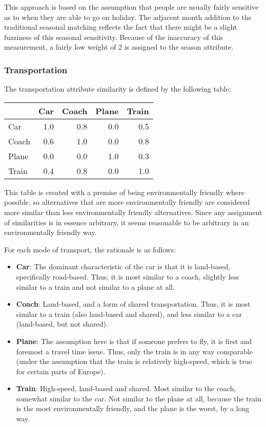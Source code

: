 \documentclass[a4paper,11pt]{scrartcl}
\begin{document}
This approach is based on the assumption that people are usually
fairly sensitive as to when they are able to go on holiday. The
adjacent month addition to the traditional seasonal matching reflects
the fact that there might be a slight fuzziness of this seasonal
sensitivity. Because of the inaccuracy of this measurement, a fairly
low weight of 2 is assigned to the season attribute.

\subsubsection{Transportation}
The transportation attribute similarity is defined by the following
table:


\begin{center}
\begin{tabular}{l|rrrr}
        &  Car  &  Coach  &  Plane  &  Train  \\
\hline
 Car    &  1.0  &    0.8  &    0.0  &    0.5  \\
 Coach  &  0.6  &    1.0  &    0.0  &    0.8  \\
 Plane  &  0.0  &    0.0  &    1.0  &    0.3  \\
 Train  &  0.4  &    0.8  &    0.0  &    1.0  \\
\end{tabular}
\end{center}

This table is created with a premise of being environmentally friendly
where possible, so alternatives that are more environmentally
friendly are considered more similar than less environmentally
friendly alternatives. Since any assignment of similarities is in
essence arbitrary, it seems reasonable to be arbitrary in an
environmentally friendly way.

For each mode of transport, the rationale is as follows:

\begin{itemize}
\item \textbf{Car}: The dominant characteristic of the car is that it is
  land-based, specifically road-based. Thus, it is most similar to a
  coach, slightly less similar to a train and not similar to a plane
  at all.
\item \textbf{Coach}: Land-based, and a form of shared transportation.
  Thus, it is most similar to a train (also land-based and shared),
  and less similar to a car (land-based, but not shared).
\item \textbf{Plane}: The assumption here is that if someone prefers
  to fly, it is first and foremost a travel time issue. Thus, only the
  train is in any way comparable (under the assumption that the train
  is relatively high-speed, which is true for certain parts of
  Europe).
\item \textbf{Train}: High-speed, land-based and shared. Most similar
  to the coach, somewhat similar to the car. Not similar to the plane
  at all, because the train is the most environmentally friendly, and
  the plane is the worst, by a long way.
\end{itemize}
\end{document}
